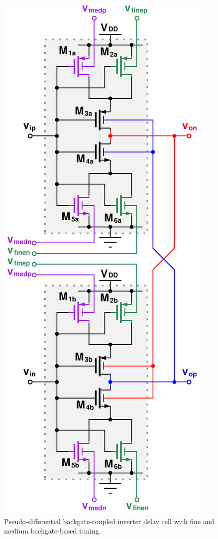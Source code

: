 			\begin{figure}[htb!]
			        \centering
			        \includegraphics[height=0.5\textheight, angle=0]{./figs/design/delay_cell_pd_inv}
			    \caption{Pseudo-differential backgate-coupled inverter delay cell with fine and medium backgate-based tuning.}
			    \label{fig:delay_cell_pd_inv}
			\end{figure}


